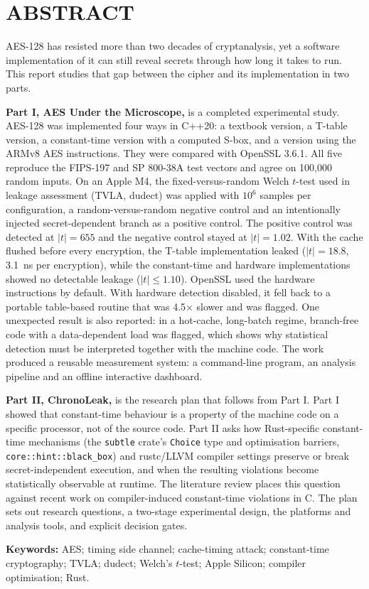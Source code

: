 \chapter*{\normalsize ABSTRACT}
\begingroup{}

AES-128 has resisted more than two decades of cryptanalysis, yet a software implementation of it can still reveal secrets through how long it takes to run. This report studies that gap between the cipher and its implementation in two parts.

\textbf{Part I, AES Under the Microscope,} is a completed experimental study. AES-128 was implemented four ways in C++20: a textbook version, a T-table version, a constant-time version with a computed S-box, and a version using the ARMv8 AES instructions. They were compared with OpenSSL 3.6.1. All five reproduce the FIPS-197 and SP 800-38A test vectors and agree on 100,000 random inputs. On an Apple M4, the fixed-versus-random Welch $t$-test used in leakage assessment (TVLA, dudect) was applied with $10^6$ samples per configuration, a random-versus-random negative control and an intentionally injected secret-dependent branch as a positive control. The positive control was detected at $\lvert t\rvert = 655$ and the negative control stayed at $\lvert t\rvert = 1.02$. With the cache flushed before every encryption, the T-table implementation leaked ($\lvert t\rvert = 18.8$, 3.1~ns per encryption), while the constant-time and hardware implementations showed no detectable leakage ($\lvert t\rvert \le 1.10$). OpenSSL used the hardware instructions by default. With hardware detection disabled, it fell back to a portable table-based routine that was 4.5$\times$ slower and was flagged. One unexpected result is also reported: in a hot-cache, long-batch regime, branch-free code with a data-dependent load was flagged, which shows why statistical detection must be interpreted together with the machine code. The work produced a reusable measurement system: a command-line program, an analysis pipeline and an offline interactive dashboard.

\textbf{Part II, ChronoLeak,} is the research plan that follows from Part I. Part I showed that constant-time behaviour is a property of the machine code on a specific processor, not of the source code. Part II asks how Rust-specific constant-time mechanisms (the \texttt{subtle} crate's \texttt{Choice} type and optimisation barriers, \texttt{core::hint::black\_box}) and rustc/LLVM compiler settings preserve or break secret-independent execution, and when the resulting violations become statistically observable at runtime. The literature review places this question against recent work on compiler-induced constant-time violations in C. The plan sets out research questions, a two-stage experimental design, the platforms and analysis tools, and explicit decision gates.

\vspace{0.2cm}
\noindent\textbf{Keywords:} AES; timing side channel; cache-timing attack; constant-time cryptography; TVLA; dudect; Welch's $t$-test; Apple Silicon; compiler optimisation; Rust.
\endgroup
\clearpage
